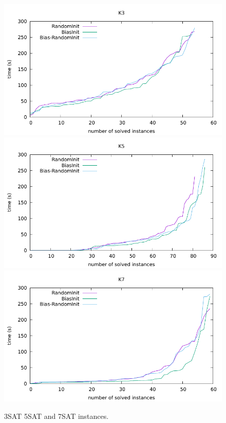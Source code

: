 \documentclass[12pt,a4paper,twoside]{scrartcl}
\numberwithin{equation}{section}
\begin{document}
\begin{figure}[H]
  \includegraphics[scale = 1]{DATA/K3/e1.pdf}
  \includegraphics[scale = 1]{DATA/K5/e1.pdf}
  \includegraphics[scale = 1]{DATA/K7/e1.pdf}
  \label{Experiment 1 k357 cactus plot}
  \caption{3SAT 5SAT and 7SAT instances.}
\end{figure}
\end{document}
